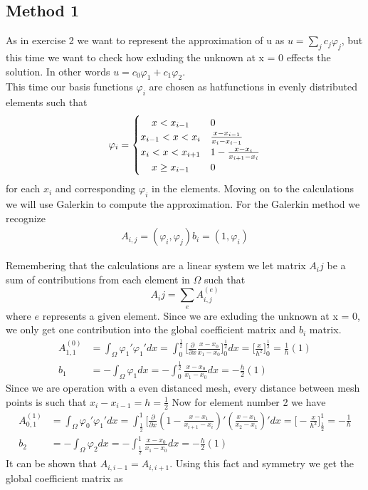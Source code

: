\documentclass[a4paper,norsk]{article}
\begin{document}
\subsection{Method 1}
 As in exercise 2 we want to represent the approximation of u as $u = \sum\limits_{j} c_j \varphi_j$, but this time we want to check how exluding the unknown at x = 0 effects the solution. In other words $u= c_0\varphi_1 + c_1\varphi_2 $. \\
 This time our basis functions $\varphi_i$ are chosen as hatfunctions in evenly distributed elements such that
\[
  \varphi_i = \left\{\def\arraystretch{1.2}%
  \begin{array}{@{}c@{\quad}l@{}}
    x < x_{i-1}  & 0\\
    x_{i-1} < x < x_{i} & \frac{x-x_{i-1}}{x_i-x_{i-1}}\\
    x_{i} < x < x_{i+1} & 1-\frac{x-x_i}{x_{i+1}-x_i} \\
    x \geq x_{i-1} &0
  \end{array}\right.
\]
for each $x_i$ and corresponding $\varphi_i$ in the elements. Moving on to the calculations we will use Galerkin to compute the approximation. 
For the Galerkin method we recognize 
\begin{align*}
A_{i,j} = (\varphi_i,\varphi_j)
b_i = (1,\varphi_i)
\end{align*}

Remembering that the calculations are a linear system we let matrix $A_{i}{j}$ be a sum of contributions from each element in $\Omega$ such that \[A_{i}{j}= \sum\limits_{e} A_{i,j}^{(e)}\] where $e$ represents a given element. 
Since we are exluding the unknown at x = 0, we only get one contribution into the global coefficient matrix and $b_i$ matrix.
\begin{align*}
A_{1,1}^{(0)} &= \int_\Omega \varphi_1' \varphi_1' dx = \int_0^{\frac{1}{2}} \Big[\frac{\partial}{\partial x} 
\frac{x-x_0}{x_1-x_0}\Big]_0^{\frac{1}{2}} dx = \Big[\frac{x}{h^2}\Big]_0^{\frac{1}{2}} = \frac{1}{h}(1) \\ 
b_1 &= -\int_\Omega \varphi_1 dx = -\int_0^{\frac{1}{2}} \frac{x-x_0}{x_1-x_0} dx = -\frac{h}{2}(1)
\end{align*}
Since we are operation with a even distanced mesh, every distance between mesh points is such that
$x_i-x_{i-1} = h = \frac{1}{2}$
Now for element number 2 we have
\begin{align*}
A_{0,1}^{(1)} &= \int_\Omega \varphi_0' \varphi_1' dx = \int_{\frac{1}{2}}^1 \Big[\frac{\partial}{\partial x} 
(1-\frac{x-x_1}{x_{i+1}-x_i})'(\frac{x-x_1}{x_2-x_1})' dx =
 \Big[-\frac{x}{h^2}\Big]_{\frac{1}{2}}^1 = -\frac{1}{h}\\
b_2 &= -\int_\Omega \varphi_2 dx = -\int_{\frac{1}{2}}^{1} \frac{x-x_0}{x_1-x_0} dx = -\frac{h}{2}(1)
\end{align*}
It can be shown that $A_{i,i-1} = A_{i,i+1}$. Using this fact and symmetry we get the global coefficient matrix as
\end{document}
